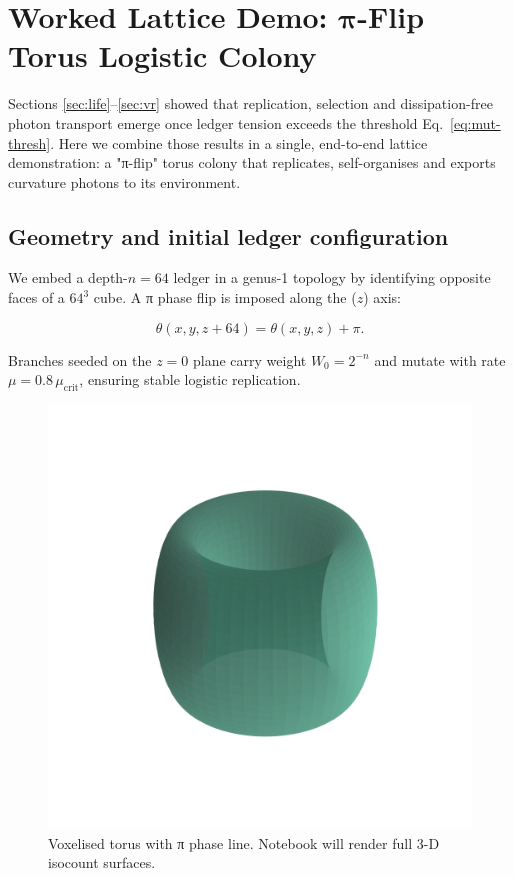 \section{Worked Lattice Demo: $\boldsymbol{\pi}$-Flip Torus Logistic Colony}
\label{sec:lattice-demo}

Sections \ref{sec:life}–\ref{sec:vr} showed that replication, selection
and dissipation-free photon transport emerge once ledger tension exceeds
the threshold Eq.~\eqref{eq:mut-thresh}.  Here we combine those results
in a single, end-to-end lattice demonstration: a "π-flip" torus colony
that replicates, self-organises and exports curvature photons to its
environment.

\subsection{Geometry and initial ledger configuration}

We embed a depth-$n=64$ ledger in a genus-1 topology by identifying
opposite faces of a $64^3$ cube.  A π phase flip is imposed along the
($z$) axis:

\[
  \theta(x,y,z+64) = \theta(x,y,z)+\pi .
\tag{13.1}\label{eq:pi-flip}
\]

Branches seeded on the $z=0$ plane carry weight
$W_0 = 2^{-n}$ and mutate with rate
$\mu=0.8\,\mu_{\mathrm{crit}}$, ensuring stable logistic replication.

\begin{figure}[t]
  \centering
  \includegraphics[width=\linewidth]{figs/lattice_torus_geometry.png}
  \caption{Voxelised torus with π phase line.  Notebook will render full 3-D isocount surfaces.}
  \label{fig:torus-geom}
\end{figure}

